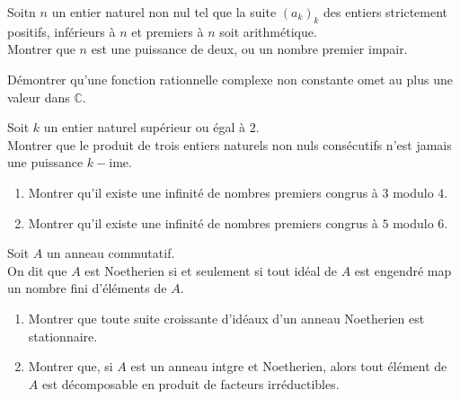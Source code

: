 \begin{exer}
Soitn $n$ un entier naturel non nul tel que la suite $(a_k)_k$ des entiers strictement positifs, %
inf\'erieurs à $n$ et premiers à $n$ soit arithm\'etique.\\
Montrer que $n$ est une puissance de deux, ou un nombre premier impair.
\end{exer}

\begin{exer}
D\'emontrer qu'une fonction rationnelle complexe non constante omet au plus une valeur dans $\mathbb{C}$.
\end{exer}

\begin{exer}
Soit $k$ un entier naturel sup\'erieur ou \'egal à $2$.\\
Montrer que le produit de trois entiers naturels non nuls cons\'ecutifs n'est jamais une puissance $k-$ime.
\end{exer}

\begin{exer}
\begin{enumerate}
\item Montrer qu'il existe une infinit\'e de nombres premiers congrus à $3$ modulo $4$.
\item Montrer qu'il existe une infinit\'e de nombres premiers congrus à $5$ modulo $6$.
\end{enumerate}
\end{exer}

\begin{exer}
Soit $A$ un anneau commutatif.\\
On dit que $A$ est Noetherien si et seulement si tout id\'eal de $A$ est engendr\'e map un nombre fini d'\'el\'ements de $A$.
\begin{enumerate}
\item Montrer que toute suite croissante d'id\'eaux d'un anneau Noetherien est stationnaire.
\item Montrer que, si $A$ est un anneau intgre et Noetherien, alors tout \'el\'ement de $A$ est d\'ecomposable en produit de facteurs irr\'eductibles.
\end{enumerate}
\end{exer}

